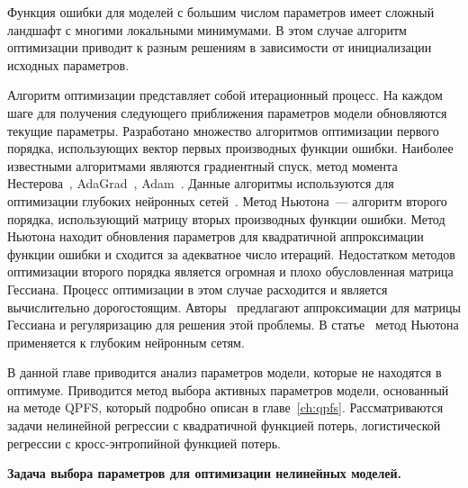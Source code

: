 \documentclass[11pt, a5paper]{dissert}
\begin{document}
Функция ошибки для моделей с большим числом параметров имеет сложный ландшафт с многими локальными минимумами.
В этом случае алгоритм оптимизации приводит к разным решениям в зависимости от инициализации исходных параметров.

Алгоритм оптимизации представляет собой итерационный процесс.
На каждом шаге для получения следующего приближения параметров модели обновляются текущие параметры.
Разработано множество алгоритмов оптимизации первого порядка, использующих вектор первых производных функции ошибки.
Наиболее известными алгоритмами являются градиентный спуск, 
метод момента Нестерова~\cite{nesterov1983momentum}, AdaGrad~\cite{duchi2011adagrad}, Adam~\cite{kingma2014adam}.
Данные алгоритмы используются для оптимизации глубоких нейронных сетей~\cite{goodfellow2016deeplearningbook}.
Метод Ньютона~--- алгоритм второго порядка, использующий матрицу вторых производных функции ошибки.
Метод Ньютона находит обновления параметров для квадратичной аппроксимации функции ошибки и сходится за адекватное число итераций.
Недостатком методов оптимизации второго порядка является огромная и плохо обусловленная матрица Гессиана.
Процесс оптимизации в этом случае расходится и является вычислительно дорогостоящим.
Авторы~\cite{avriel2003nonlinear,blaschke1997convergence} предлагают аппроксимации для матрицы Гессиана и регуляризацию для решения этой проблемы.
В статье~\cite{botev2017newtondeeplearning} метод Ньютона применяется к глубоким нейронным сетям.

В данной главе приводится анализ параметров модели, которые не находятся в оптимуме.
Приводится метод выбора активных параметров модели, основанный на методе QPFS, который подробно описан в главе~\ref{ch:qpfs}.
Рассматриваются задачи нелинейной регрессии с квадратичной функцией потерь, логистической регрессии с кросс-энтропийной функцией потерь.  

\textbf{Задача выбора параметров для оптимизации нелинейных моделей.}
\label{sec:ch4:newton_qpfs_param_selection}
\end{document}

